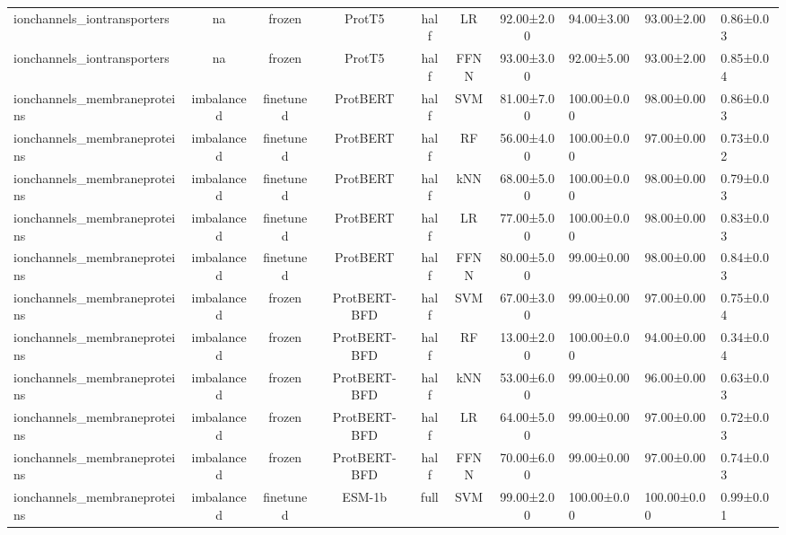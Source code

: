 \begin{tabular}{lcccccc}
     ionchannels\_iontransporters &         na &         frozen &       ProtT5 &      half &         LR &  92.00±2.00 &  94.00±3.00 &  93.00±2.00 & 0.86±0.03 \\
     ionchannels\_iontransporters &         na &         frozen &       ProtT5 &      half &       FFNN &  93.00±3.00 &  92.00±5.00 &  93.00±2.00 & 0.85±0.04 \\
    ionchannels\_membraneproteins & imbalanced &      finetuned &     ProtBERT &      half &        SVM &  81.00±7.00 & 100.00±0.00 &  98.00±0.00 & 0.86±0.03 \\
    ionchannels\_membraneproteins & imbalanced &      finetuned &     ProtBERT &      half &         RF &  56.00±4.00 & 100.00±0.00 &  97.00±0.00 & 0.73±0.02 \\
    ionchannels\_membraneproteins & imbalanced &      finetuned &     ProtBERT &      half &        kNN &  68.00±5.00 & 100.00±0.00 &  98.00±0.00 & 0.79±0.03 \\
    ionchannels\_membraneproteins & imbalanced &      finetuned &     ProtBERT &      half &         LR &  77.00±5.00 & 100.00±0.00 &  98.00±0.00 & 0.83±0.03 \\
    ionchannels\_membraneproteins & imbalanced &      finetuned &     ProtBERT &      half &       FFNN &  80.00±5.00 &  99.00±0.00 &  98.00±0.00 & 0.84±0.03 \\
    ionchannels\_membraneproteins & imbalanced &         frozen & ProtBERT-BFD &      half &        SVM &  67.00±3.00 &  99.00±0.00 &  97.00±0.00 & 0.75±0.04 \\
    ionchannels\_membraneproteins & imbalanced &         frozen & ProtBERT-BFD &      half &         RF &  13.00±2.00 & 100.00±0.00 &  94.00±0.00 & 0.34±0.04 \\
    ionchannels\_membraneproteins & imbalanced &         frozen & ProtBERT-BFD &      half &        kNN &  53.00±6.00 &  99.00±0.00 &  96.00±0.00 & 0.63±0.03 \\
    ionchannels\_membraneproteins & imbalanced &         frozen & ProtBERT-BFD &      half &         LR &  64.00±5.00 &  99.00±0.00 &  97.00±0.00 & 0.72±0.03 \\
    ionchannels\_membraneproteins & imbalanced &         frozen & ProtBERT-BFD &      half &       FFNN &  70.00±6.00 &  99.00±0.00 &  97.00±0.00 & 0.74±0.03 \\
    ionchannels\_membraneproteins & imbalanced &      finetuned &       ESM-1b &      full &        SVM &  99.00±2.00 & 100.00±0.00 & 100.00±0.00 & 0.99±0.01 \\

\end{tabular}
